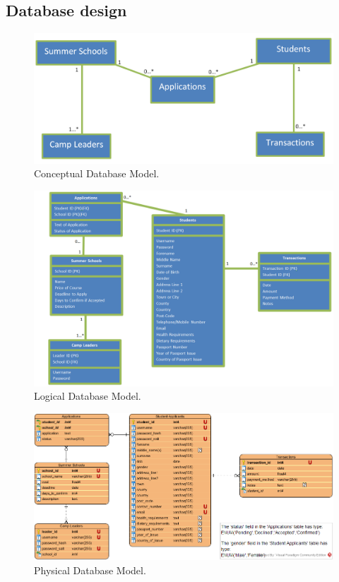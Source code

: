 \documentclass{project}
\begin{document}
\subsection{Database design}
\begin{figure}[H]
\includegraphics[width=\linewidth]{conceptualDatabase.png}
\caption{Conceptual Database Model.}
\label{fig:conceptual-database-model}
\end{figure}
\begin{figure}[H]
\includegraphics[width=\linewidth]{logicalDatabase.png}
\caption{Logical Database Model.}
\label{fig:logical-database-model}
\end{figure}
\begin{figure}[H]
\includegraphics[width=\linewidth]{physicalDatabase.png}
\caption{Physical Database Model.}
\label{fig:physical-database-model}
\end{figure}
\label{thelastpage}
\end{document}
